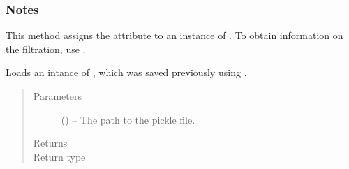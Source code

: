 \documentclass[letterpaper,10pt,english]{sphinxmanual}
\begin{document}
\begin{fulllineitems}
\begin{fulllineitems}
\begin{quote}
\begin{description}
\end{description}\end{quote}
\subsubsection*{Notes}

\sphinxAtStartPar
This method assigns the attribute  to an instance of
{\hyperref[\detokenize{references/freqfilter:nmrespy.freqfilter.FrequencyFilter}]{}}. To obtain information
on the filtration, use {\hyperref[\detokenize{references/core:nmrespy.core.Estimator.get_filter_info}]{}}.

\end{fulllineitems}


\begin{fulllineitems}
\label{\detokenize{references/core:nmrespy.core.Estimator.from_pickle}}
\sphinxAtStartPar
Loads an intance of {\hyperref[\detokenize{references/core:nmrespy.core.Estimator}]{}}, which was saved
previously using {\hyperref[\detokenize{references/core:nmrespy.core.Estimator.to_pickle}]{}}.
\begin{quote}\begin{description}
\item[{Parameters}] \leavevmode
\sphinxAtStartPar
{} () – The path to the pickle file. 

\item[{Returns}] \leavevmode
\sphinxAtStartPar
{}

\item[{Return type}] \leavevmode
\sphinxAtStartPar
{\hyperref[\detokenize{references/core:nmrespy.core.Estimator}]{}}

\end{description}\end{quote}

\end{fulllineitems}
\end{fulllineitems}
\end{document}
